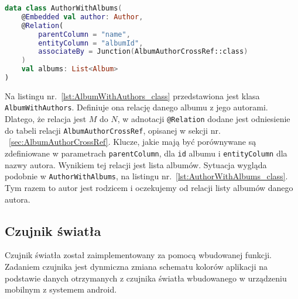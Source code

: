 \begin{lstlisting}[caption=Deklaracja relacji \texttt{AuthorWithAlbums}, label={lst:AuthorWithAlbums_class}, language=kotlin]
data class AuthorWithAlbums(
    @Embedded val author: Author,
    @Relation(
        parentColumn = "name",
        entityColumn = "albumId",
        associateBy = Junction(AlbumAuthorCrossRef::class)
    )
    val albums: List<Album>
)
\end{lstlisting}

Na listingu nr.~\ref{lst:AlbumWithAuthors_class} przedstawiona jest klasa \texttt{AlbumWithAuthors}. Definiuje ona relację danego albumu z jego autorami. Dlatego, że relacja jest $M$ do $N$, w adnotacji \texttt{@Relation} dodane jest odniesienie do tabeli relacji \texttt{AlbumAuthorCrossRef}, opisanej w sekcji nr. ~\ref{sec:AlbumAuthorCrossRef}. Klucze, jakie mają być porównywane są zdefiniowane w parametrach \texttt{parentColumn}, dla \texttt{id} albumu i \texttt{entityColumn} dla nazwy autora. Wynikiem tej relacji jest lista albumów. Sytuacja wygląda podobnie w \texttt{AuthorWithAlbums}, na listingu nr.~\ref{lst:AuthorWithAlbums_class}. Tym razem to autor jest rodzicem i oczekujemy od relacji listy albumów danego autora.

\subsection{Czujnik światła}
Czujnik światła został zaimplementowany za pomocą wbudowanej funkcji. Zadaniem czujnika jest dynmiczna zmiana schematu kolorów aplikacji na podstawie danych otrzymanych z czujnika światła wbudowanego w urządzeniu mobilnym z systemem android.

